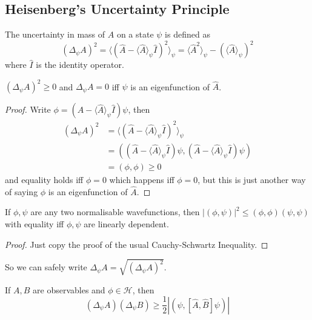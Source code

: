 \subsection{Heisenberg's Uncertainty Principle}
\begin{definition}
    The uncertainty in mass of $A$ on a state $\psi$ is defined as
    $$(\Delta_\psi A)^2=\langle (\hat{A}-\langle\hat{A}\rangle_\psi\hat{I})^2\rangle_\psi=\langle\hat{A}^2\rangle_\psi-(\langle\hat{A}\rangle_\psi)^2$$
    where $\hat{I}$ is the identity operator.
\end{definition}
\begin{lemma}
    $(\Delta_\psi A)^2\ge 0$ and $\Delta_\psi A=0$ iff $\psi$ is an eigenfunction of $\hat{A}$.
\end{lemma}
\begin{proof}
    Write $\phi=(\hat{A}-\langle\hat{A}\rangle_\psi\hat{I})\psi$, then
    \begin{align*}
        (\Delta_\psi A)^2&=\langle (\hat{A}-\langle\hat{A}\rangle_\psi\hat{I})^2\rangle_\psi\\
        &=((\hat{A}-\langle\hat{A}\rangle_\psi\hat{I})\psi,(\hat{A}-\langle\hat{A}\rangle_\psi\hat{I})\psi)\\
        &=(\phi,\phi)\ge 0
    \end{align*}
    and equality holds iff $\phi=0$ which happens iff $\phi=0$, but this is just another way of saying $\phi$ is an eigenfunction of $\hat{A}$.
\end{proof}
\begin{theorem}
    If $\phi,\psi$ are any two normalisable wavefunctions, then $|(\phi,\psi)|^2\le(\phi,\phi)(\psi,\psi)$ with equality iff $\phi,\psi$ are linearly dependent.
\end{theorem}
\begin{proof}
    Just copy the proof of the usual Cauchy-Schwartz Inequality.
\end{proof}
So we can safely write $\Delta_\psi A=\sqrt{(\Delta_\psi A)^2}$.
\begin{theorem}
    If $A,B$ are observables and $\phi\in\mathcal H$, then
    $$(\Delta_\psi A)(\Delta_\psi B)\ge\frac{1}{2}|(\psi,[\hat{A},\hat{B}]\psi)|$$
\end{theorem}
